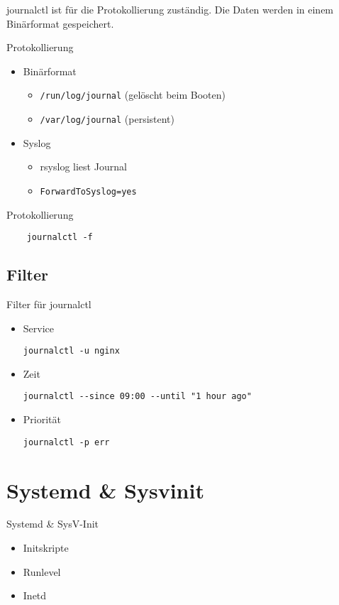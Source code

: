 journalctl ist für die Protokollierung zuständig. Die Daten werden in einem Binärformat gespeichert.

\begin{frame}[fragile]{Protokollierung}
\begin{itemize}
\item Binärformat
\begin{itemize}
\item \verb|/run/log/journal| (gelöscht beim Booten)
\item \verb|/var/log/journal| (persistent)
\end{itemize}
\item Syslog
	\begin{itemize}
	\item rsyslog liest Journal
	\item \verb|ForwardToSyslog=yes|
	\end{itemize}
\end{itemize}
\end{frame}

\begin{frame}[fragile]{Protokollierung}
  \begin{lstlisting}
    journalctl -f
    \end{lstlisting}
\end{frame}
  
\subsection{Filter}

\begin{frame}[fragile]{Filter für journalctl}
  \begin{itemize}
  \item Service

	  \verb|journalctl -u nginx|
  \item Zeit

	  \verb|journalctl --since 09:00 --until "1 hour ago"|
  \item Priorität

	  \verb|journalctl -p err|
  \end{itemize}
\end{frame}

\section{Systemd \& Sysvinit}

\begin{frame}{Systemd \& SysV-Init}
  \begin{itemize}
  \item Initskripte
  \item Runlevel
  \item Inetd
  \end{itemize}
\end{frame}


